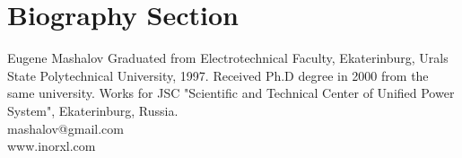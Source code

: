 \documentclass[lettersize,journal]{IEEEtran}
\begin{document}
\newpage
\section{Biography Section}
\vspace{-33pt}
\begin{IEEEbiography}{Eugene Mashalov}
Graduated from Electrotechnical Faculty, Ekaterinburg, Urals State Polytechnical University, 1997. 
Received Ph.D degree in 2000 from the same university. 
Works for JSC "Scientific and Technical Center of Unified Power System", Ekaterinburg, Russia.\\
mashalov@gmail.com \\
www.inorxl.com
\end{IEEEbiography}
\vfill
\end{document}
